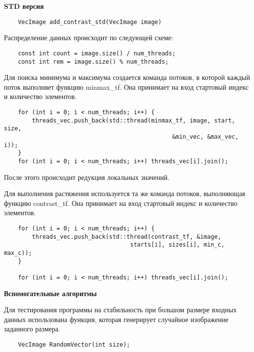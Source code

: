 \documentclass{report}
\begin{document}
    \newpage
    \textbf{STD версия}
    \begin{lstlisting}
    VecImage add_contrast_std(VecImage image)
    \end{lstlisting}
    Распределение данных происходит по следующей схеме:
    \begin{lstlisting}
    const int count = image.size() / num_threads;
    const int rem = image.size() % num_threads;
    \end{lstlisting}
    \par Для поиска минимума и максимума создается команда потоков, в которой каждый поток выполняет функцию minmax\_tf. Она принимает на вход стартовый индекс и количество элементов.
    \begin{lstlisting}
    for (int i = 0; i < num_threads; i++) {
        threads_vec.push_back(std::thread(minmax_tf, image, start, size,
                                                &min_vec, &max_vec, i));
    }
    for (int i = 0; i < num_threads; i++) threads_vec[i].join();
    \end{lstlisting}
    \par После этого происходит редукция локальных значений.
    \par Для выполнения растяжения используется та же команда потоков, выполняющая функцию contrast\_tf. Она принимает на вход стартовый индекс и количество элементов.
    \begin{lstlisting}
    for (int i = 0; i < num_threads; i++) {
        threads_vec.push_back(std::thread(contrast_tf, &image,
                                    starts[i], sizes[i], min_c, max_c));
    }

    for (int i = 0; i < num_threads; i++) threads_vec[i].join();
    \end{lstlisting}
    \textbf{Вспомогательные алгоритмы}
    \par Для тестирования программы на стабильность при большом размере входных данных использована функция, которая генерирует случайное изображение заданного размера.
    \begin{lstlisting}
    VecImage RandomVector(int size);
    \end{lstlisting}
    
    \newpage
\end{document}
